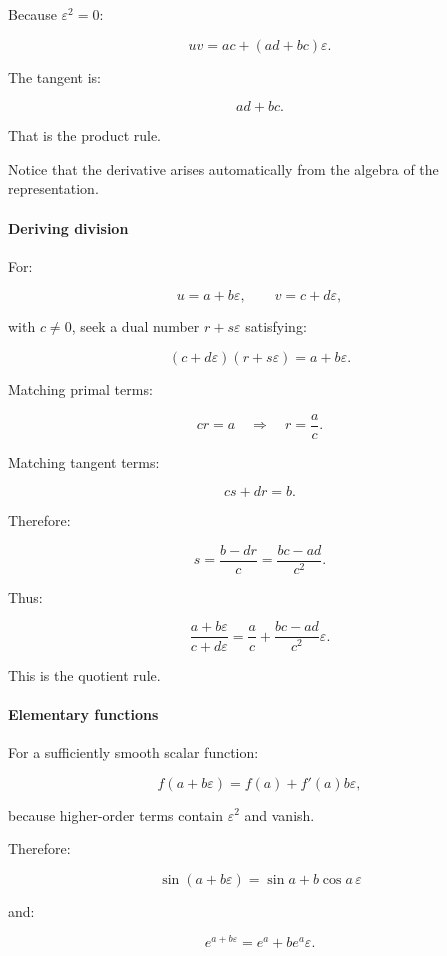 Because \(\varepsilon^2=0\):

\[
\boxed{ uv=ac+(ad+bc)\varepsilon }.
\]

The tangent is:

\[
ad+bc.
\]

That is the product rule.

Notice that the derivative arises automatically from the algebra of the representation.

\paragraph{Deriving division}\label{02-foundations-ii-ch022-deriving-division}

For:

\[
u=a+b\varepsilon,\qquad v=c+d\varepsilon,
\]

with \(c\ne0\), seek a dual number \(r+s\varepsilon\) satisfying:

\[
(c+d\varepsilon)(r+s\varepsilon) = a+b\varepsilon.
\]

Matching primal terms:

\[
cr=a \quad\Longrightarrow\quad r=\frac ac.
\]

Matching tangent terms:

\[
cs+dr=b.
\]

Therefore:

\[
s=\frac{b-dr}{c} =\frac{bc-ad}{c^2}.
\]

Thus:

\[
\boxed{ \frac{a+b\varepsilon}{c+d\varepsilon} = \frac ac+ \frac{bc-ad}{c^2}\varepsilon }.
\]

This is the quotient rule.

\paragraph{Elementary functions}\label{02-foundations-ii-ch022-elementary-functions}

For a sufficiently smooth scalar function:

\[
f(a+b\varepsilon) = f(a)+f'(a)b\varepsilon,
\]

because higher-order terms contain \(\varepsilon^2\) and vanish.

Therefore:

\[
\boxed{ \sin(a+b\varepsilon) = \sin a+b\cos a\,\varepsilon }
\]

and:

\[
\boxed{ e^{a+b\varepsilon} = e^a+be^a\varepsilon }.
\]

